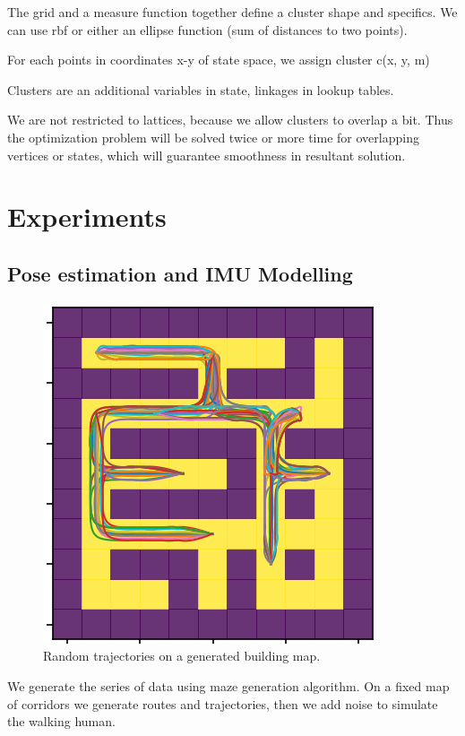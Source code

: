 \documentclass[a4paper, 12pt]{article}
\begin{document}
The grid and a measure function together define a cluster shape and specifics. We can use rbf or either an ellipse function (sum of distances to two points).

For each points in coordinates x-y of state space, we assign cluster c(x, y, m)

Clusters are an additional variables in state, linkages in lookup tables.

We are not restricted to lattices, because we allow clusters to overlap a bit. Thus the optimization problem will be solved twice or more time for overlapping vertices or states, which will guarantee smoothness in resultant solution.


\section{Experiments}

\subsection{Pose estimation and IMU Modelling}

\begin{figure}
	\centering
	\includegraphics[width=0.4\linewidth]{images/routes2}
	\caption{Random trajectories on a generated building map.}
	\label{fig:routes1}
\end{figure}

We generate the series of data using maze generation algorithm. On a fixed map of corridors we generate routes and trajectories, then we add noise to simulate the walking human.
\end{document}
